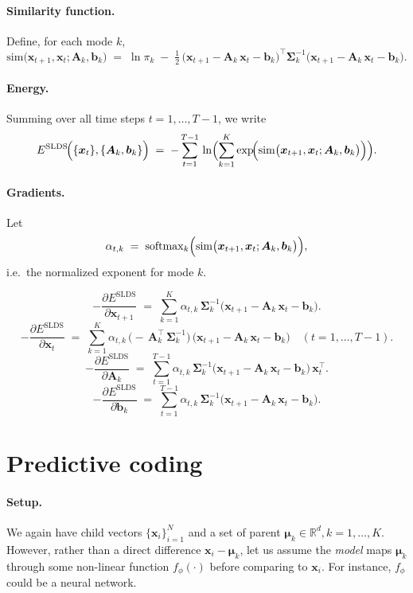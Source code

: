 \documentclass{article}
\begin{document}
\paragraph{Similarity function.}
Define, for each mode \(k\),
\[
\mathrm{sim}\bigl(\bm{x}_{t+1}, \bm{x}_t; \bm{A}_k, \bm{b}_k\bigr)
\;=\;
\ln \pi_k
\;-\;
\tfrac12\,\bigl(\bm{x}_{t+1} - \bm{A}_k\,\bm{x}_t - \bm{b}_k\bigr)^\top
\bm{\Sigma}_k^{-1}
\bigl(\bm{x}_{t+1} - \bm{A}_k\,\bm{x}_t - \bm{b}_k\bigr).
\]

\paragraph{Energy.}
Summing over all time steps \(t = 1,\ldots,T-1\), we write
\begin{equation}
E^{\mathrm{SLDS}}\!\Bigl(\{\bm{x}_t\}, \{\bm{A}_k, \bm{b}_k\}\Bigr)
\;=\;
-\sum_{t=1}^{T-1}\,
\ln \Bigl(\sum_{k=1}^K
\exp\!\Bigl(
\mathrm{sim}\bigl(\bm{x}_{t+1}, \bm{x}_t; \bm{A}_k, \bm{b}_k\bigr)
\Bigr)\Bigr).
\end{equation}

\paragraph{Gradients.}
Let 
\[
\alpha_{t,k} 
\;=\;
\mathrm{softmax}_{k}\Bigl(
\mathrm{sim}\bigl(\bm{x}_{t+1}, \bm{x}_t; \bm{A}_k, \bm{b}_k\bigr)\Bigr),
\]
i.e.\ the normalized exponent for mode \(k\).  

\[
-\frac{\partial E^{\mathrm{SLDS}}}{\partial \bm{x}_{t+1}}
\;=\;
\sum_{k=1}^K 
\alpha_{t,k}\,\bm{\Sigma}_k^{-1}
\bigl(\bm{x}_{t+1} - \bm{A}_k\,\bm{x}_t - \bm{b}_k\bigr).
\]
\[
-\frac{\partial E^{\mathrm{SLDS}}}{\partial \bm{x}_t}
\;=\;
\sum_{k=1}^K 
\alpha_{t,k}\,
\bigl(-\,\bm{A}_k^\top\,\bm{\Sigma}_k^{-1}\bigr)\,
\bigl(\bm{x}_{t+1} - \bm{A}_k\,\bm{x}_t - \bm{b}_k\bigr)
\quad (t=1,\dots,T-1).
\]
\[
-\frac{\partial E^{\mathrm{SLDS}}}{\partial \bm{A}_k}
\;=\;
\sum_{t=1}^{T-1}
\alpha_{t,k}\,\bm{\Sigma}_k^{-1}
\bigl(\bm{x}_{t+1} - \bm{A}_k\,\bm{x}_t - \bm{b}_k\bigr)\,\bm{x}_t^\top.
\]
\[
-\frac{\partial E^{\mathrm{SLDS}}}{\partial \bm{b}_k}
\;=\;
\sum_{t=1}^{T-1}
\alpha_{t,k}\,\bm{\Sigma}_k^{-1}
\bigl(\bm{x}_{t+1} - \bm{A}_k\,\bm{x}_t - \bm{b}_k\bigr).
\]

\section{Predictive coding}

\paragraph{Setup.}
We again have child vectors \(\{\bm{x}_i\}_{i=1}^N\) and a set of parent \(\bm{\mu}_k \in \mathbb{R}^d, k=1,\dots,K\).  However, rather than a direct difference \(\bm{x}_i-\bm{\mu}_k\), let us assume the \emph{model} maps \(\bm{\mu}_k\) through some non-linear function \(f_\phi(\cdot)\) before comparing to \(\bm{x}_i\).  For instance, \(f_\phi\) could be a neural network.
\end{document}
